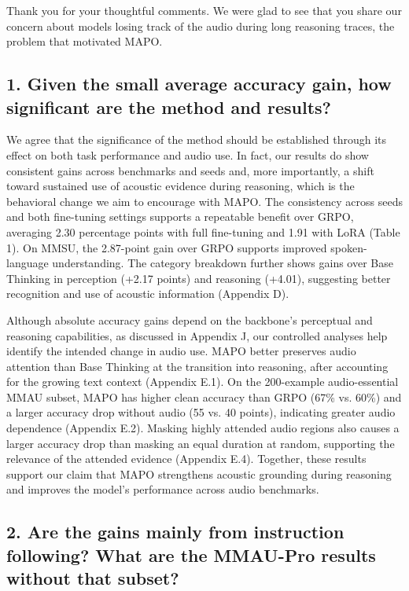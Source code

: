 Thank you for your thoughtful comments. We were glad to see that you share our concern about models losing track of the audio during long reasoning traces, the problem that motivated MAPO.

\subsection*{1. Given the small average accuracy gain, how significant are the method and results?}

We agree that the significance of the method should be established through its effect on both task performance and audio use. In fact, our results do show consistent gains across benchmarks and seeds and, more importantly, a shift toward sustained use of acoustic evidence during reasoning, which is the behavioral change we aim to encourage with MAPO. The consistency across seeds and both fine-tuning settings supports a repeatable benefit over GRPO, averaging 2.30 percentage points with full fine-tuning and 1.91 with LoRA (Table 1). On MMSU, the 2.87-point gain over GRPO supports improved spoken-language understanding. The category breakdown further shows gains over Base Thinking in perception (+2.17 points) and reasoning (+4.01), suggesting better recognition and use of acoustic information (Appendix D).

Although absolute accuracy gains depend on the backbone's perceptual and reasoning capabilities, as discussed in Appendix J, our controlled analyses help identify the intended change in audio use. MAPO better preserves audio attention than Base Thinking at the transition into reasoning, after accounting for the growing text context (Appendix E.1). On the 200-example audio-essential MMAU subset, MAPO has higher clean accuracy than GRPO (67\% vs. 60\%) and a larger accuracy drop without audio (55 vs. 40 points), indicating greater audio dependence (Appendix E.2). Masking highly attended audio regions also causes a larger accuracy drop than masking an equal duration at random, supporting the relevance of the attended evidence (Appendix E.4). Together, these results support our claim that MAPO strengthens acoustic grounding during reasoning and improves the model's performance across audio benchmarks.

\subsection*{2. Are the gains mainly from instruction following? What are the MMAU-Pro results without that subset?}

